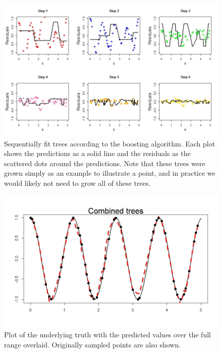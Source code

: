 \documentclass[12pt]{article}\usepackage[]{graphicx}\usepackage[]{color}
\begin{document}
\begin{figure}[h]
	\centering
	\includegraphics[width=\textwidth]{boostex.jpeg}
	\captionsetup{font=footnotesize,labelfont=footnotesize}
	\caption{\label{fig:boostex} Sequentially fit trees according to the boosting algorithm. Each plot shows the predictions as a solid line and the residuals as the scattered dots around the predictions. Note that these trees were grown simply as an example to illustrate a point, and in practice we would likely not need to grow all of these trees.}
\end{figure}

\begin{figure}[h]
	\centering
	\includegraphics[width=\textwidth]{combine.jpeg}
	\captionsetup{font=footnotesize,labelfont=footnotesize}
	\caption{\label{fig:combine} Plot of the underlying truth with the predicted values over the full range overlaid. Originally sampled points are also shown.}
\end{figure}
\end{document}
